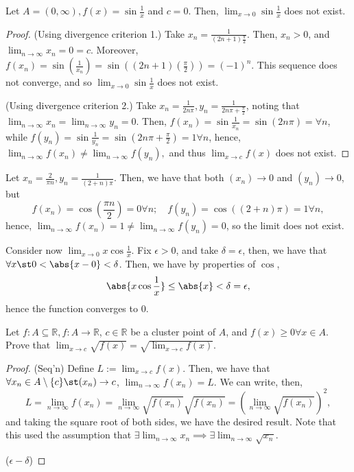 \documentclass[12pt]{article}
\renewcommand{\qedsymbol}{\Libra}
\begin{document}
\begin{example}[$f(x) = \sin \frac{1}{x}$]
  Let $A = (0, \infty), f(x) = \sin \frac{1}{x}$ and $c = 0$. Then, $\lim_{x \to 0} \sin \frac{1}{x}$ does not exist.
  \begin{proof}
    (Using divergence criterion 1.) Take $x_n = \frac{1}{(2n+1) \frac{\pi}{2}}$. Then, $x_n > 0$, and $\lim_{n \to \infty} x_n = 0 = c$. Moreover, $f(x_n) = \sin (\frac{1}{x_n}) = \sin ((2n+1)(\frac{\pi}{2})) = (-1)^{n}$. This sequence does not converge, and so $\lim_{x \to 0} \sin \frac{1}{x}$ does not exist. $\quad$ \qedsymbol

    \noindent(Using divergence criterion 2.) Take $x_n = \frac{1}{2n\pi}, y_n = \frac{1}{2n\pi + \frac{\pi}{2}}$, noting that $\lim_{n\to\infty} x_n = \lim_{n \to \infty} y_n = 0$. Then, $f(x_n) = \sin \frac{1}{x_n} = \sin (2n \pi) = \forall n$, while $f(y_n) = \sin \frac{1}{y_n} = \sin (2n \pi + \frac{\pi}{2}) = 1 \forall n$, hence, $\lim_{n\to\infty} f(x_n) \neq \lim_{n\to\infty} f(y_n),$ and thus $\lim_{x\to c} f(x)$ does not exist.
  \end{proof}
\end{example}

\begin{example}[Abbott, 4.2E2]
  Let $x_n = \frac{2}{\pi n}, y_n = \frac{1}{(2+n)\pi}$. Then, we have that both $(x_n) \to 0$ and $(y_n) \to 0$, but \[
  f(x_n) = \cos (\frac{\pi n}{2}) = 0 \forall n; \quad f(y_n) = \cos ((2 + n) \pi) = 1 \forall n,
  \]
  hence, $\lim_{n\to\infty} f(x_n) = 1 \neq \lim_{n\to\infty}f(y_n) = 0$, so the limit does not exist.

  Consider now $\lim_{x\to 0} x \cos \frac{1}{x}$. Fix $\epsilon > 0$, and take $\delta = \epsilon$, then, we have that $\forall x \st 0 < \abs{x - 0} < \delta$. Then, we have by properties of $\cos$, \[
  \abs{x \cos \frac{1}{x}} \leq \abs{x} < \delta = \epsilon,
  \]
  hence the function converges to $0$.
\end{example}

\begin{example}[Abbott, 4.2E14]
  Let $f : A \subseteq \mathbb{R}, f : A \to \mathbb{R}$, $c \in \mathbb{R}$ be a cluster point of $A$, and $f(x) \geq 0 \forall x \in A$. Prove that $\lim_{x \to c} \sqrt{f(x)} = \sqrt{ \lim_{x\to c}f(x)}$.
  \begin{proof}
    (Seq'n) Define $L := \lim_{x\to c} f(x)$. Then, we have that $\forall x_n \in A\setminus\{c\} \st (x_n) \to c$, $\lim_{n\to\infty} f(x_n) = L$. We can write, then,
    \[
    L = \lim_{n \to \infty} f(x_n) = \lim_{n\to\infty} \sqrt{f(x_n)}\sqrt{f(x_n)} = \left(\lim_{n\to\infty}\sqrt{f(x_n)}\right)^{2},
    \]
    and taking the square root of both sides, we have the desired result. Note that this used the assumption that $\exists\lim_{n\to\infty} x_n \implies \exists\lim_{n\to\infty} \sqrt{x_n}$.


    \noindent($\epsilon-\delta$) %

  \end{proof}
\end{example}
\end{document}
